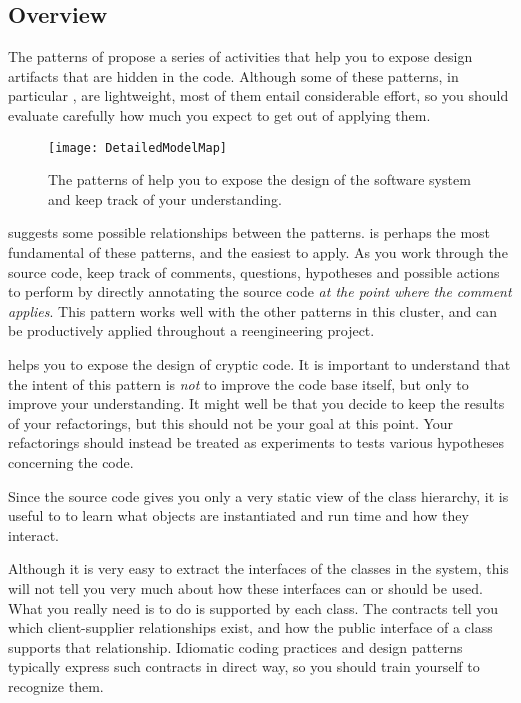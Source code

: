 \documentclass[a4paper,10pt,twoside]{book}
\begin{document}
\subsection*{Overview}

The patterns of  propose a series of activities that help you to expose design artifacts that are hidden in the code. Although some of these patterns, in particular , are lightweight, most of them entail considerable effort, so you should evaluate carefully how much you expect to get out of applying them.

\begin{figure}
\begin{center}
\texttt{[image: DetailedModelMap]}
\caption{The patterns of  help you to expose the design of the software system and keep track of your understanding.}
\end{center}
\end{figure}

 suggests some possible relationships between the patterns.  is perhaps the most fundamental of these patterns, and the easiest to apply. As you work through the source code, keep track of comments, questions, hypotheses and possible actions to perform by directly annotating the source code \emph{at the point where the comment applies}. This pattern works well with the other patterns in this cluster, and can be productively applied throughout a reengineering project.

 helps you to expose the design of cryptic code. It is important to understand that the intent of this pattern is \emph{not} to improve the code base itself, but only to improve your understanding. It might well be that you decide to keep the results of your refactorings, but this should not be your goal at this point. Your refactorings should instead be treated as experiments to tests various hypotheses concerning the code. 

Since the source code gives you only a very static view of the class hierarchy, it is useful to  to learn what objects are instantiated and run time and how they interact.

Although it is very easy to extract the interfaces of the classes in the system, this will not tell you very much about how these interfaces can or should be used. What you really need is to do is  supported by each class. The contracts tell you which client-supplier relationships exist, and how the public interface of a class supports that relationship. Idiomatic coding practices and design patterns typically express such contracts in direct way, so you should train yourself to recognize them.
\end{document}
